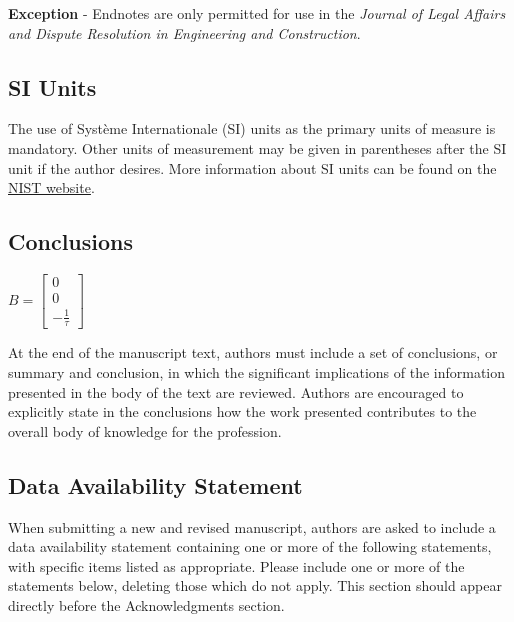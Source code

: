\documentclass[Journal,letterpaper]{ascelike-new}
\begin{document}
\textbf{Exception} - Endnotes are only permitted for use in the \textit{Journal of Legal Affairs and Dispute Resolution in Engineering and Construction}.

\subsection{SI Units}

The use of Système Internationale (SI) units as the primary units of measure is mandatory. Other units of measurement may be given in parentheses after the SI unit if the author desires. More information about SI units can be found on the \href{http://physics.nist.gov/cuu/Units/index.html}{NIST website}.

\subsection{Conclusions}
${B} = \left[ {\begin{array}{*{20}{c}}
                              0 \\
                              0 \\
                              - \frac{1}{\tau }
                        \end{array}} \right]$

At the end of the manuscript text, authors must include a set of conclusions, or summary and conclusion, in which the significant implications of the information presented in the body of the text are reviewed. Authors are encouraged to explicitly state in the conclusions how the work presented contributes to the overall body of knowledge for the profession.

\subsection{Data Availability Statement}

When submitting a new and revised manuscript, authors are asked to include a data availability statement containing one or more of the following statements, with specific items listed as appropriate. Please include one or more of the statements below, deleting those which do not apply. This section should appear directly before the Acknowledgments section.
\end{document}
